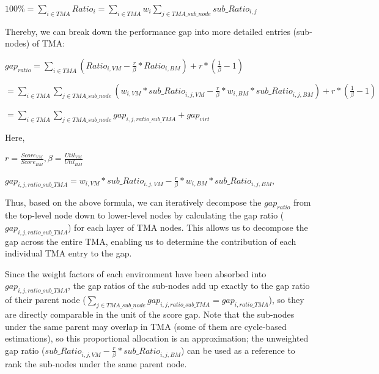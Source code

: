 \documentclass[12pt]{article}
\newcommand{\npar}[1]{#1\par}
\newcommand{\dmath}[1]{{\centering $\displaystyle #1$\par}}
\begin{document}
\dmath{100\%=\sum\limits_{\mathit{i}\in \mathit{TMA}}{\mathit{Rati}{\mathit{o}}_{\mathit{i}}}=\sum\limits_{\mathit{i}\in \mathit{TMA}}{{\mathit{w}}_{\mathit{i}}\sum\limits_{\mathit{j}\in \mathit{TMA\_sub\_node}}{\mathit{sub\_Rati}{\mathit{o}}_{\mathit{i},\mathit{j}}}}}
\npar{\hspace*{4\fontdimen2\font}Thereby, we can break down the performance gap into more detailed entries (sub-nodes) of TMA:}
\dmath{\mathit{ga}{\mathit{p}}_{\mathit{ratio}}=\sum\limits_{\mathit{i}\in \mathit{TMA}}{\left( \mathit{Rati}{\mathit{o}}_{\mathit{i},\mathit{VM}}-\frac{\mathit{r}}{\beta }*\mathit{Rati}{\mathit{o}}_{\mathit{i},\mathit{BM}} \right)}+\mathit{r}*(\frac{1}{\beta }-1)}
\dmath{=\sum\limits_{\mathit{i}\in \mathit{TMA}}{\sum\limits_{\mathit{j}\in \mathit{TMA\_sub\_node}}{\left( {\mathit{w}}_{\mathit{i},\mathit{VM}}*{\mathit{sub\_Ratio}}_{\mathit{i},\mathit{j},\mathit{VM}}-\frac{\mathit{r}}{\beta }*{\mathit{w}}_{\mathit{i},\mathit{BM}}*{\mathit{sub\_Ratio}}_{\mathit{i},\mathit{j},\mathit{BM}} \right)}}+\mathit{r}*\left( \frac{1}{\beta }-1 \right)}
\dmath{=\sum\limits_{\mathit{i}\in \mathit{TMA}}{\sum\limits_{\mathit{j}\in \mathit{TMA\_sub\_node}}{{\mathit{gap}}_{\mathit{i},\mathit{j},\mathit{ratio\_sub\_TMA}}}}+{\mathit{gap}}_{\mathit{virt}}}
\npar{\hspace*{4\fontdimen2\font}Here,}
\dmath{\mathit{r}=\frac{\mathit{Scor}{\mathit{e}}_{\mathit{VM}}}{\mathit{Scor}{\mathit{e}}_{\mathit{BM}}},\beta =\frac{\mathit{Uti}{\mathit{l}}_{\mathit{VM}}}{\mathit{Uti}{\mathit{l}}_{\mathit{BM}}}}
\dmath{{\mathit{gap}}_{\mathit{i},\mathit{j},\mathit{ratio\_sub\_TMA}}={\mathit{w}}_{\mathit{i},\mathit{VM}}*{\mathit{sub\_Ratio}}_{\mathit{i},\mathit{j},\mathit{VM}}-\frac{\mathit{r}}{\beta }*{\mathit{w}}_{\mathit{i},\mathit{BM}}*{\mathit{sub\_Ratio}}_{\mathit{i},\mathit{j},\mathit{BM}},}
\npar{\hspace*{4\fontdimen2\font}Thus, based on the above formula, we can iteratively decompose the $\mathit{ga}{\mathit{p}}_{\mathit{ratio}}$ from the top-level node down to lower-level nodes by calculating the gap ratio ($\mathit{ga}{\mathit{p}}_{\mathit{i},\mathit{j},\mathit{ratio\_sub\_TMA}}$) for each layer of TMA nodes. This allows us to decompose the gap across the entire TMA, enabling us to determine the contribution of each individual TMA entry to the gap.}
\npar{\hspace*{4\fontdimen2\font}Since the weight factors of each environment have been absorbed into ${\mathit{gap}}_{\mathit{i},\mathit{j},\mathit{ratio\_sub\_TMA}}$, the gap ratios of the sub-nodes add up exactly to the gap ratio of their parent node ($\sum\limits_{\mathit{j}\in \mathit{TMA\_sub\_node}}{{\mathit{gap}}_{\mathit{i},\mathit{j},\mathit{ratio\_sub\_TMA}}}={\mathit{gap}}_{\mathit{i},\mathit{ratio\_TMA}}$), so they are directly comparable in the unit of the score gap. Note that the sub-nodes under the same parent may overlap in TMA (some of them are cycle-based estimations), so this proportional allocation is an approximation; the unweighted gap ratio (${\mathit{sub\_Ratio}}_{\mathit{i},\mathit{j},\mathit{VM}}-\frac{\mathit{r}}{\beta }*{\mathit{sub\_Ratio}}_{\mathit{i},\mathit{j},\mathit{BM}}$) can be used as a reference to rank the sub-nodes under the same parent node.}
\end{document}
